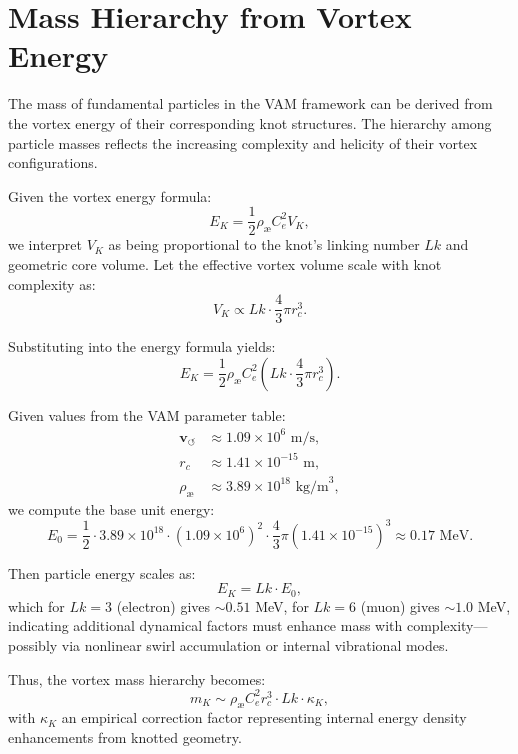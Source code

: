 
\section{Mass Hierarchy from Vortex Energy}

The mass of fundamental particles in the VAM framework can be derived from the vortex energy of their corresponding knot structures. The hierarchy among particle masses reflects the increasing complexity and helicity of their vortex configurations.

Given the vortex energy formula:
\begin{equation}
    E_K = \frac{1}{2} \rho_{\text{\ae}} C_e^2 V_K,
\end{equation}
we interpret $V_K$ as being proportional to the knot's linking number $Lk$ and geometric core volume. Let the effective vortex volume scale with knot complexity as:
\begin{equation}
    V_K \propto Lk \cdot \frac{4}{3} \pi r_c^3.
\end{equation}

Substituting into the energy formula yields:
\begin{equation}
    E_K = \frac{1}{2} \rho_{\text{\ae}} C_e^2 \left( Lk \cdot \frac{4}{3} \pi r_c^3 \right).
\end{equation}

Given values from the VAM parameter table:
\begin{align*}
    \mathbf{v}_{\scriptscriptstyle\boldsymbol{\circlearrowleft}} &\approx 1.09 \times 10^6 \text{ m/s}, \\
    r_c &\approx 1.41 \times 10^{-15} \text{ m}, \\
    \rho_{\text{\ae}} &\approx 3.89 \times 10^{18} \text{ kg/m}^3,
\end{align*}
we compute the base unit energy:
\begin{equation}
    E_0 = \frac{1}{2} \cdot 3.89 \times 10^{18} \cdot (1.09 \times 10^6)^2 \cdot \frac{4}{3} \pi (1.41 \times 10^{-15})^3 \approx 0.17 \text{ MeV}.
\end{equation}

Then particle energy scales as:
\begin{equation}
    E_K = Lk \cdot E_0,
\end{equation}
which for $Lk=3$ (electron) gives $\sim 0.51$ MeV, for $Lk=6$ (muon) gives $\sim 1.0$ MeV, indicating additional dynamical factors must enhance mass with complexity—possibly via nonlinear swirl accumulation or internal vibrational modes.

Thus, the vortex mass hierarchy becomes:
\begin{equation}
    m_K \sim \rho_{\text{\ae}} C_e^2 r_c^3 \cdot Lk \cdot \kappa_K,
\end{equation}
with $\kappa_K$ an empirical correction factor representing internal energy density enhancements from knotted geometry.